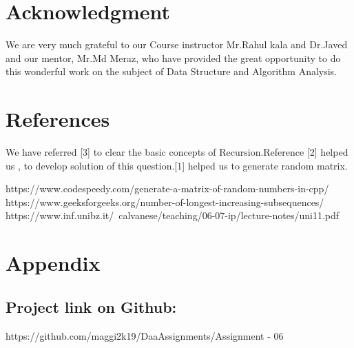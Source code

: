 \documentclass[conference]{IEEEtran}
\begin{document}
\section{\textbf{Acknowledgment}}
We are very much grateful to our Course instructor Mr.Rahul kala and Dr.Javed  and our mentor, Mr.Md Meraz, who have provided the great opportunity to do this wonderful work on the subject of Data Structure and Algorithm Analysis.

\section{\textbf {References}} 

We have referred [3] to clear the basic concepts of Recursion.Reference [2] helped us , to develop solution of this question.[1] helped us to generate random matrix.
\begin{thebibliography}{00}
https://www.codespeedy.com/generate-a-matrix-of-random-numbers-in-cpp/
https://www.geeksforgeeks.org/number-of-longest-increasing-subsequences/
https://www.inf.unibz.it/~calvanese/teaching/06-07-ip/lecture-notes/uni11.pdf

\end{thebibliography}

\section{\textbf{Appendix}}

\subsection{Project link on Github:}
https://github.com/maggi2k19/DaaAssignments/Assignment - 06
\end{document}
